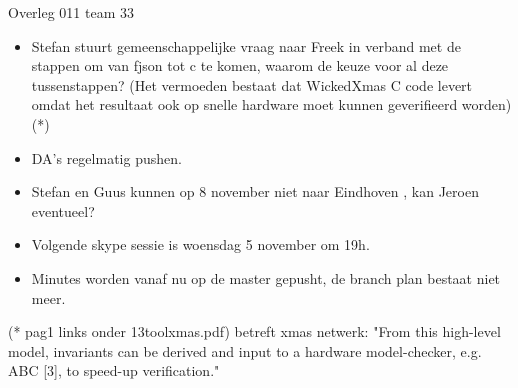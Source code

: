 \documentclass{article}
\begin{document}
\begin{Minutes}{Overleg 011 team 33}

\begin{itemize}
\item Stefan stuurt gemeenschappelijke vraag naar Freek in verband met de stappen om van fjson tot c te komen, waarom de keuze voor al deze tussenstappen? (Het vermoeden bestaat dat WickedXmas C code levert omdat het resultaat ook op snelle hardware moet kunnen geverifieerd worden) (*)
\item DA's regelmatig pushen.
\item Stefan en Guus kunnen op 8 november niet naar Eindhoven , kan Jeroen eventueel?
\item Volgende skype sessie is woensdag 5 november om 19h.
\item Minutes worden vanaf nu op de master gepusht, de branch plan bestaat niet meer.
\end{itemize}
(* pag1 links onder 13toolxmas.pdf) betreft xmas netwerk: "From this high-level model, invariants can be derived and input to a hardware model-checker, e.g. ABC [3], to speed-up verification."

\end{Minutes}
\end{document}
